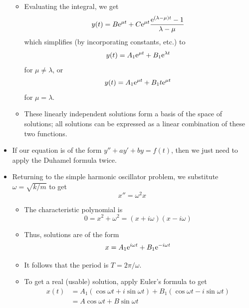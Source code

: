 \documentclass[../notes.tex]{subfiles}
\begin{document}
\begin{itemize}
\begin{itemize}
        \item Evaluating the integral, we get
        \begin{equation*}
            y(t) = B\e[\mu t]+C\e[\mu t]\frac{\e[(\lambda-\mu)t]-1}{\lambda-\mu}
        \end{equation*}
        which simplifies (by incorporating constants, etc.) to
        \begin{equation*}
            y(t) = A_1\e[\mu t]+B_1\e[\lambda t]
        \end{equation*}
        for $\mu\neq\lambda$, or
        \begin{equation*}
            y(t) = A_1\e[\mu t]+B_1t\e[\mu t]
        \end{equation*}
        for $\mu=\lambda$.
        \item These linearly independent solutions form a basis of the space of solutions; all solutions can be expressed as a linear combination of these two functions.
    \end{itemize}
    \item If our equation is of the form $y''+ay'+by=f(t)$, then we just need to apply the Duhamel formula twice.
    \item Returning to the simple harmonic oscillator problem, we substitute $\omega=\sqrt{k/m}$ to get
    \begin{equation*}
        x'' = \omega^2x
    \end{equation*}
    \begin{itemize}
        \item The characteristic polynomial is
        \begin{equation*}
            0 = x^2+\omega^2
            = (x+i\omega)(x-i\omega)
        \end{equation*}
        \item Thus, solutions are of the form
        \begin{equation*}
            x = A_1\e[i\omega t]+B_1\e[-i\omega t]
        \end{equation*}
        \item It follows that the period is $T=2\pi/\omega$.
        \item To get a real (usable) solution, apply Euler's formula to get
        \begin{align*}
            x(t) &= A_1(\cos\omega t+i\sin\omega t)+B_1(\cos\omega t-i\sin\omega t)\\
            &= A\cos\omega t+B\sin\omega t
        \end{align*}

\end{itemize}
\end{itemize}
\end{document}
